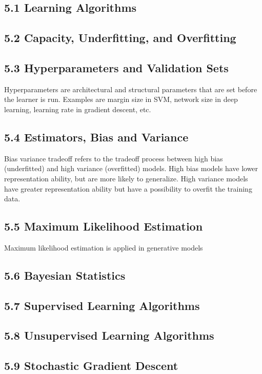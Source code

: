 \documentclass[a4paper]{report}
\begin{document}
\subsection{5.1 Learning Algorithms}
\subsection{5.2 Capacity, Underfitting, and Overfitting}


\subsection{5.3 Hyperparameters and Validation Sets}
Hyperparameters are architectural and structural parameters that are set before the learner is run. Examples are margin size in SVM, network size in deep learning, learning rate in gradient descent, etc.

\subsection{5.4 Estimators, Bias and Variance}
Bias variance tradeoff refers to the tradeoff process between high bias (underfitted) and high variance (overfitted) models. High bias models have lower representation ability, but are more likely to generalize. High variance models have greater representation ability but have a possibility to overfit the training data.

\subsection{5.5 Maximum Likelihood Estimation}
Maximum likelihood estimation is applied in generative models

\subsection{5.6 Bayesian Statistics}
\subsection{5.7 Supervised Learning Algorithms}
\subsection{5.8 Unsupervised Learning Algorithms}
\subsection{5.9 Stochastic Gradient Descent}
\end{document}

